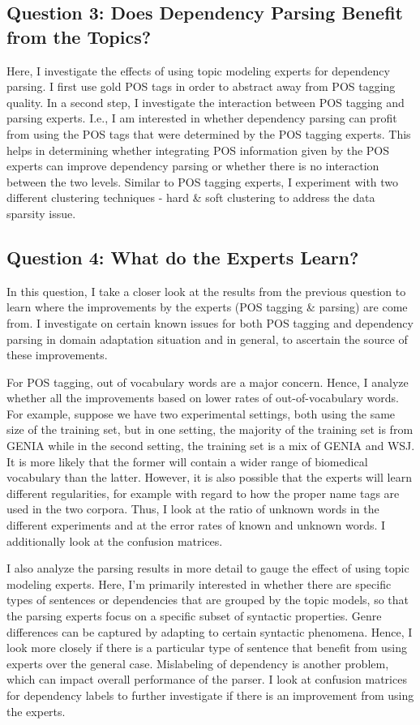 \subsection*{Question 3: Does Dependency Parsing Benefit from the Topics?}

Here, I investigate the effects of using topic modeling experts for dependency parsing. I first use gold POS tags in order to abstract away from POS tagging quality. In a second step, I investigate the interaction between POS tagging and parsing experts. I.e., I am interested in whether dependency parsing can profit from using the POS tags that were determined by the POS tagging experts. This helps in determining whether integrating POS information given by the POS experts can improve dependency parsing or whether there is no interaction between the two levels. Similar to POS tagging experts, I experiment with two different clustering techniques - hard \& soft clustering to address the data sparsity issue.

\subsection*{Question 4: What do the Experts Learn?}

In this question, I take a closer look at the results from the previous question to learn where the improvements by the experts (POS tagging \& parsing) are come from. I investigate on certain known issues for both POS tagging and dependency parsing in domain adaptation situation and in general, to ascertain the source of these improvements. 

For POS tagging, out of vocabulary words are a major concern. Hence, I analyze whether all the improvements based on lower rates of out-of-vocabulary words. For example, suppose we have two experimental settings, both using the same size of the training set, but in one setting, the majority of the training set is from GENIA while in the second setting, the training set is a mix of GENIA and WSJ. It is more likely that the former will contain a wider range of biomedical vocabulary than the latter. However, it is also possible that the experts will learn different regularities, for example with regard to how the proper name tags are used in the two corpora. Thus, I look at the ratio of unknown words in the different experiments and at the error rates of known and unknown words. I additionally look at the confusion matrices.

I also analyze the parsing results in more detail to gauge the effect of using topic modeling experts. Here, I'm primarily interested in whether there are specific types of sentences or dependencies that are grouped by the topic models, so that the parsing experts focus on a specific subset of syntactic properties. Genre differences can be captured by adapting to certain syntactic phenomena. Hence, I look more closely if there is a particular type of sentence that benefit from using experts over the general case. Mislabeling of dependency is another problem, which can impact overall performance of the parser. I look at confusion matrices for dependency labels to further investigate if there is an improvement from using the experts. 

